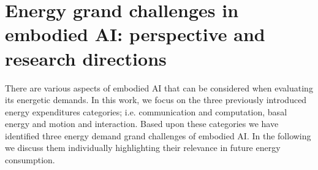 \section{Energy grand challenges in embodied AI: perspective and research directions}
There are various aspects of embodied AI that can be considered when evaluating its energetic demands. In this work, we focus on the three previously introduced energy expenditures categories; i.e. communication and computation, basal energy and motion and interaction. Based upon these categories we have identified three energy demand grand challenges of embodied AI. In the following we discuss them individually highlighting their relevance in future energy consumption.

